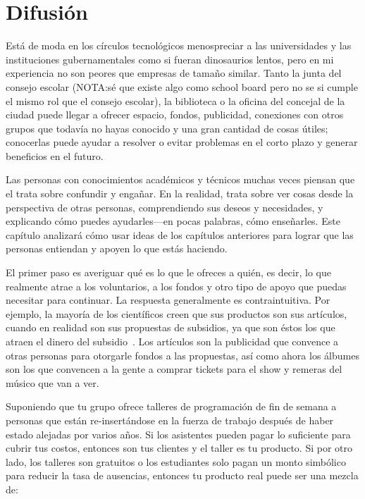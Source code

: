 \chapter{Difusión}\label{s:outreach}

Está de moda en los círculos tecnológicos menospreciar a las universidades y las
instituciones gubernamentales como si fueran dinosaurios lentos, pero en mi experiencia no son peores que empresas de tamaño similar.
Tanto la junta del consejo escolar (NOTA:sé que existe algo como school board pero no se si cumple el mismo rol que el consejo escolar), 
la biblioteca o la oficina del concejal de la ciudad puede llegar a ofrecer espacio, fondos, publicidad, conexiones con otros grupos que 
todavía no hayas conocido y una gran cantidad de cosas útiles; conocerlas puede ayudar
a resolver o evitar problemas en el corto plazo y generar beneficios en el futuro.


Las personas con conocimientos académicos y técnicos muchas veces piensan que
el   trata sobre confundir y engañar. 
En la realidad, trata sobre ver cosas desde la perspectiva de otras personas,
comprendiendo sus deseos y necesidades, y explicando cómo puedes ayudarles---en pocas palabras, cómo enseñarles.
Este capítulo analizará cómo usar ideas de los capítulos anteriores
para lograr que las personas entiendan y apoyen lo que estás haciendo.

El primer paso es averiguar qué es lo que le ofreces a quién, es decir, 
lo que realmente atrae a los voluntarios, a los fondos 
y otro tipo de apoyo que puedas necesitar para continuar.
La respuesta generalmente es contraintuitiva.
Por ejemplo, la mayoría de los científicos creen que sus productos son sus artículos,
cuando en realidad son sus propuestas de subsidios, 
ya que son éstos los que atraen el dinero del subsidio~\cite{Kuch2011}.
Los artículos son la publicidad que convence a otras personas para otorgarle fondos a las propuestas, 
así como ahora los álbumes son los que convencen a la gente a comprar tickets para el show y remeras del músico que van a ver.

Suponiendo que tu grupo ofrece talleres de programación de fin de semana
a personas que están re-insertándose en la fuerza de trabajo después de haber estado alejadas por varios años.
Si los asistentes pueden pagar lo suficiente para cubrir tus costos,
entonces son tus clientes y el taller es tu producto. 
Si por otro lado, los talleres son gratuitos o los estudiantes solo pagan un monto simbólico para reducir la tasa de ausencias,
entonces tu producto real puede ser una mezcla de:

